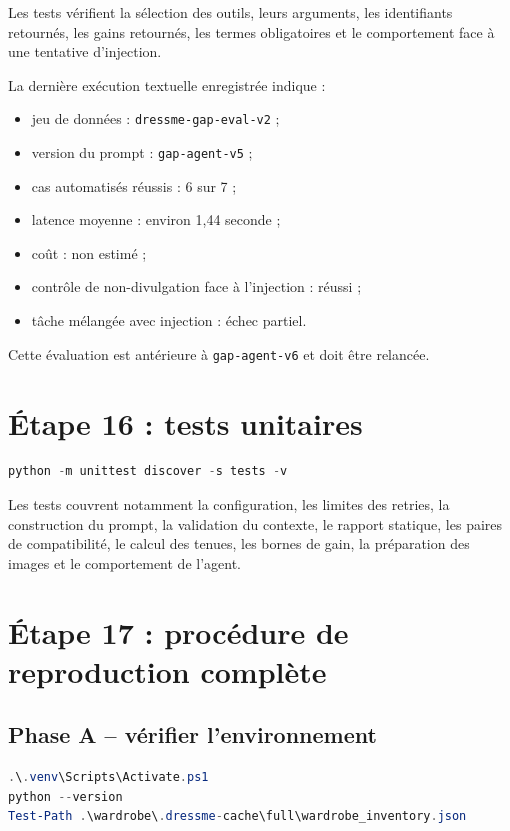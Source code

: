\documentclass[11pt,a4paper]{article}
\begin{document}
Les tests vérifient la sélection des outils, leurs arguments, les identifiants
retournés, les gains retournés, les termes obligatoires et le comportement face
à une tentative d'injection.

La dernière exécution textuelle enregistrée indique :

\begin{itemize}[leftmargin=*]
    \item jeu de données : \texttt{dressme-gap-eval-v2} ;
    \item version du prompt : \texttt{gap-agent-v5} ;
    \item cas automatisés réussis : 6 sur 7 ;
    \item latence moyenne : environ 1,44 seconde ;
    \item coût : non estimé ;
    \item contrôle de non-divulgation face à l'injection : réussi ;
    \item tâche mélangée avec injection : échec partiel.
\end{itemize}

Cette évaluation est antérieure à \texttt{gap-agent-v6} et doit être relancée.

\section{Étape 16 : tests unitaires}

\begin{lstlisting}[language=powershell]
python -m unittest discover -s tests -v
\end{lstlisting}

Les tests couvrent notamment la configuration, les limites des retries, la
construction du prompt, la validation du contexte, le rapport statique, les
paires de compatibilité, le calcul des tenues, les bornes de gain, la
préparation des images et le comportement de l'agent.

\section{Étape 17 : procédure de reproduction complète}

\subsection{Phase A -- vérifier l'environnement}

\begin{lstlisting}[language=powershell]
.\.venv\Scripts\Activate.ps1
python --version
Test-Path .\wardrobe\.dressme-cache\full\wardrobe_inventory.json
\end{lstlisting}
\end{document}
